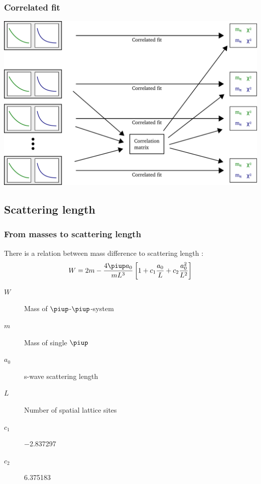 \documentclass[english, fleqn]{beamer}
\begin{document}
%
%

\begin{frame}
    \frametitle{Correlated fit}
    \begin{center}
        \includegraphics[scale=\scale]{sketches/06-fit.pdf}
    \end{center}
\end{frame}

\subsection{Scattering length}

\begin{frame}
    \frametitle{From masses to scattering length}

    There is a relation between mass difference to scattering length
    \parencite[(1.3)]{luescher/volume_dependence}:
    \[
        W = 2m - \frac{4 \piup a_0}{m L^3} \sbr{1 + c_1 \frac{a_0}L + c_2 \frac{a_0^2}{L^2}}
    \]

    \begin{description}
        \item[$W$] Mass of $\piup$-$\piup$-system
        \item[$m$] Mass of single $\piup$
        \item[$a_0$] s-wave scattering length
        \item[$L$] Number of spatial lattice sites
        \item[$c_1$] \num{-2.837297}
        \item[$c_2$] \num{6.375183}
    \end{description}
\end{frame}
\end{document}
